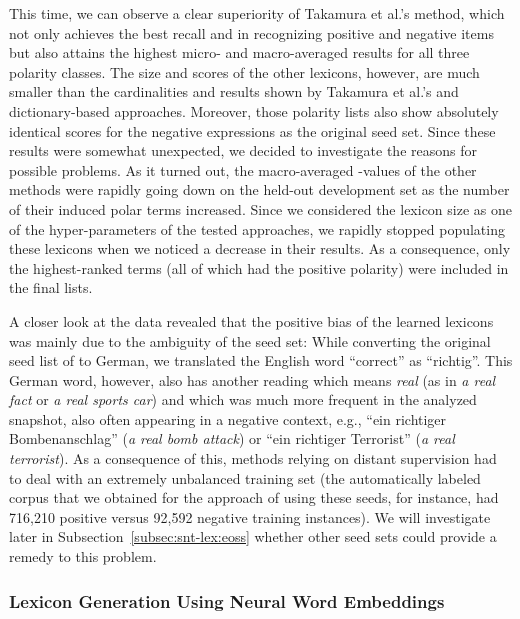 This time, we can observe a clear superiority of Takamura et al.'s
method, which not only achieves the best recall and \F{} in
recognizing positive and negative items but also attains the highest
micro- and macro-averaged results for all three polarity classes.
The size and scores of the other lexicons, however, are much smaller
than the cardinalities and results shown by Takamura et al.'s and
dictionary-based approaches.  Moreover, those polarity lists also show
absolutely identical scores for the negative expressions as the
original seed set.  Since these results were somewhat unexpected, we
decided to investigate the reasons for possible problems.  As it
turned out, the macro-averaged \F{}-values of the other methods were
rapidly going down on the held-out development set as the number of
their induced polar terms increased.  Since we considered the lexicon
size as one of the hyper-parameters of the tested approaches, we
rapidly stopped populating these lexicons when we noticed a decrease
in their results.  As a consequence, only the highest-ranked terms
(all of which had the positive polarity) were included in the final
lists.

A closer look at the data revealed that the positive bias of the
learned lexicons was mainly due to the ambiguity of the seed set:
While converting the original seed list of \citet{Turney:03} to
German, we translated the English word ``correct'' as ``richtig''.
This German word, however, also has another reading which means
\emph{real} (as in \emph{a real fact} or \emph{a real sports car}) and
which was much more frequent in the analyzed snapshot, also often
appearing in a negative context, e.g., ``ein richtiger
Bombenanschlag'' (\emph{a real bomb attack}) or ``ein richtiger
Terrorist'' (\emph{a real terrorist}).  As a consequence of this,
methods relying on distant supervision had to deal with an extremely
unbalanced training set (the automatically labeled corpus that we
obtained for the approach of \citet{Kiritchenko:14} using these seeds,
for instance, had 716,210 positive versus 92,592 negative training
instances).  We will investigate later in
Subsection~\ref{subsec:snt-lex:eoss} whether other seed sets could
provide a remedy to this problem.

\subsubsection{Lexicon Generation Using Neural Word Embeddings}

